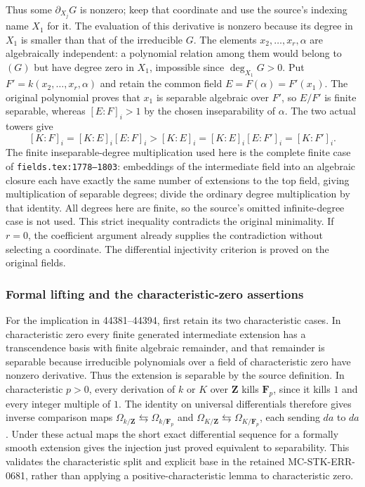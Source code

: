 Thus some \(\partial_{X_j}G\) is nonzero; keep that coordinate and use the source's indexing name \(X_1\) for it. The evaluation of this derivative is nonzero because its degree in \(X_1\) is smaller than that of the irreducible \(G\). The elements \(x_2,\ldots,x_r,\alpha\) are algebraically independent: a polynomial relation among them would belong to \((G)\) but have degree zero in \(X_1\), impossible since \(\deg_{X_1}G>0\). Put \(F'=k(x_2,\ldots,x_r,\alpha)\) and retain the common field \(E=F(\alpha)=F'(x_1)\). The original polynomial proves that \(x_1\) is separable algebraic over \(F'\), so \(E/F'\) is finite separable, whereas \([E:F]_i>1\) by the chosen inseparability of \(\alpha\). The two actual towers give \[
 [K:F]_i=[K:E]_i[E:F]_i>[K:E]_i
        =[K:E]_i[E:F']_i=[K:F']_i.
\] The finite inseparable-degree multiplication used here is the complete finite case of \texttt{fields.\AlgebraIdentifierBreak{}tex:\AlgebraIdentifierBreak{}1778–\AlgebraIdentifierBreak{}1803}: embeddings of the intermediate field into an algebraic closure each have exactly the same number of extensions to the top field, giving multiplication of separable degrees; divide the ordinary degree multiplication by that identity. All degrees here are finite, so the source's omitted infinite-degree case is not used. This strict inequality contradicts the original minimality. If \(r=0\), the coefficient argument already supplies the contradiction without selecting a coordinate. The differential injectivity criterion is proved on the original fields.

\subsubsection{Formal lifting and the characteristic-zero assertions}\label{algebra-proof-063-formal-lifting-and-the-characteristic-zero-assertions}

For the implication in 44381--44394, first retain its two characteristic cases. In characteristic zero every finite generated intermediate extension has a transcendence basis with finite algebraic remainder, and that remainder is separable because irreducible polynomials over a field of characteristic zero have nonzero derivative. Thus the extension is separable by the source definition. In characteristic \(p>0\), every derivation of \(k\) or \(K\) over \(\mathbf Z\) kills \(\mathbf F_p\), since it kills \(1\) and every integer multiple of \(1\). The identity on universal differentials therefore gives inverse comparison maps \(\Omega_{k/\mathbf Z}\leftrightarrows\Omega_{k/\mathbf F_p}\) and \(\Omega_{K/\mathbf Z}\leftrightarrows\Omega_{K/\mathbf F_p}\), each sending \(da\) to \(da\). Under these actual maps the short exact differential sequence for a formally smooth extension gives the injection just proved equivalent to separability. This validates the characteristic split and explicit base in the retained MC-\AlgebraIdentifierBreak{}STK-\AlgebraIdentifierBreak{}ERR-\AlgebraIdentifierBreak{}0681, rather than applying a positive-characteristic lemma to characteristic zero.

